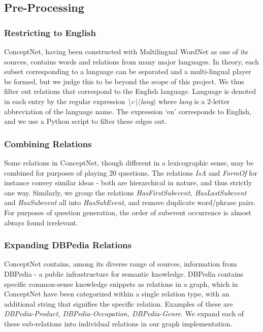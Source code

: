 \documentclass[letterpaper]{article} %
\begin{document}
\subsection{Pre-Processing}

\subsubsection{Restricting to English}
ConceptNet, having been constructed with Multilingual WordNet as one of its sources, contains words and relations from many major languages. In theory, each subset corresponding to a language can be separated and a multi-lingual player be formed, but we judge this to be beyond the scope of this project. We thus filter out relations that correspond to the English language. Language is denoted in each entry by the regular expression \textit{\textbackslash c\textbackslash $\langle$lang$\rangle$} where \textit{lang} is a 2-letter abbreviation of the language name. The expression `en' corresponds to English, and we use a Python script to filter these edges out.

\subsubsection{Combining Relations}
Some relations in ConceptNet, though different in a lexicographic sense, may be combined for purposes of playing 20 questions. The relations \textit{IsA} and \textit{FormOf} for instance convey similar ideas - both are hierarchical in nature, and thus strictly one way. Similarly, we group the relations \textit{HasFirstSubevent, HasLastSubevent} and \textit{HasSubevent} all into \textit{HasSubEvent}, and remove duplicate word/phrase pairs. For purposes of question generation, the order of subevent occurrence is almost always found irrelevant.

\subsubsection{Expanding DBPedia Relations}
ConceptNet contains, among its diverse range of sources, information from DBPedia - a public infrastructure for semantic knowledge. DBPedia contains specific common-sense knowledge snippets as relations in a graph, which in ConceptNet have been categorized within a single relation type, with an additional string that signifies the specific relation. Examples of these are \textit{DBPedia-Product, DBPedia-Occupation, DBPedia-Genre}. We expand each of these sub-relations into individual relations in our graph implementation.
\end{document}
